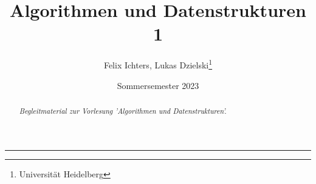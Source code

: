 \documentclass[DIV=12]{scrartcl}
\title{Algorithmen und Datenstrukturen 1}
\author{Felix Ichters, Lukas Dzielski\thanks{Universität Heidelberg}}
\date{Sommersemester 2023}
\begin{document}
\maketitle
\rule{\textwidth}{0.4pt}
\begin{abstract}
    \begin{flushright}
        \textit{Begleitmaterial zur Vorlesung 'Algorithmen und Datenstrukturen'.}
    \end{flushright}    
\end{abstract}
\par\bigskip
\begin{center}
\end{center}
\newpage
\tableofcontents
\newpage












\end{document}
